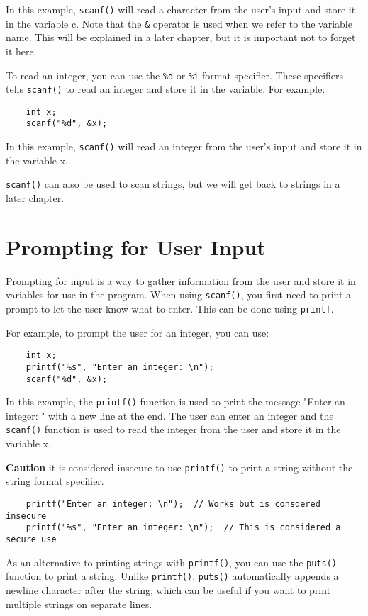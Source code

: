 In this example, {\tt scanf()} will read a character from the user's input and store it in the variable c. Note that the {\tt \&} operator is used when we refer to the variable name. This will be explained in a later chapter, but it is important not to forget it here.

To read an integer, you can use the  {\tt \%d} or  {\tt \%i}  format specifier. These specifiers tells {\tt scanf()} to read an integer and store it in the variable.  For example:
\begin{verbatim}
    int x;
    scanf("%d", &x);
\end{verbatim}
In this example, {\tt scanf()} will read an integer from the user's input and store it in the variable x.

{\tt scanf()} can also be used to scan strings, but we will get back to strings in a later chapter.


\section{Prompting for User Input}

Prompting for input is a way to gather information from the user and store it in variables for use in the program. 
When using  {\tt scanf()}, you first need to print a prompt to let the user know what to enter. This can be done using {\tt printf}. 

For example, to prompt the user for an integer, you can use:

\begin{verbatim}
    int x;
    printf("%s", "Enter an integer: \n");
    scanf("%d", &x);
\end{verbatim}
%
In this example, the {\tt printf()} function is used to print the message "Enter an integer: "  
with a new line at the end. The user can enter an integer and the {\tt scanf()}  
function is used to read the integer from the user and store it in the variable x.

{\bf Caution} it is considered insecure to use {\tt printf()} to print a string without the string format specifier.  

\begin{verbatim}
    printf("Enter an integer: \n");  // Works but is consdered insecure
    printf("%s", "Enter an integer: \n");  // This is considered a secure use
\end{verbatim}
%

As an alternative to printing strings with {\tt printf()},  you can use the {\tt puts()} function to print a string. 
Unlike {\tt printf()}, {\tt puts()} automatically appends a newline character after the string, 
which can be useful if you want to print multiple strings on separate lines.

